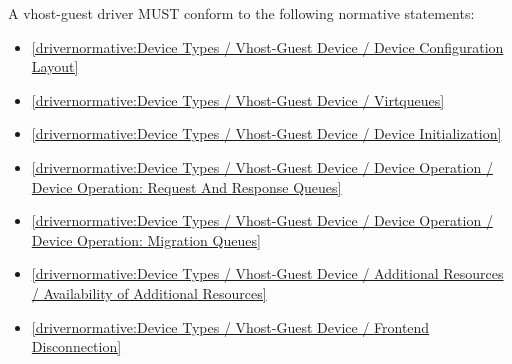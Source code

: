 \label{sec:Conformance / Driver Conformance / Vhost-Guest Driver Conformance}

A vhost-guest driver MUST conform to the following normative statements:

\begin{itemize}
\item \ref{drivernormative:Device Types / Vhost-Guest Device / Device Configuration Layout}
\item \ref{drivernormative:Device Types / Vhost-Guest Device / Virtqueues}
\item \ref{drivernormative:Device Types / Vhost-Guest Device / Device Initialization}
\item \ref{drivernormative:Device Types / Vhost-Guest Device / Device Operation / Device Operation: Request And Response Queues}
\item \ref{drivernormative:Device Types / Vhost-Guest Device / Device Operation / Device Operation: Migration Queues}
\item \ref{drivernormative:Device Types / Vhost-Guest Device / Additional Resources / Availability of Additional Resources}
\item \ref{drivernormative:Device Types / Vhost-Guest Device / Frontend Disconnection}
\end{itemize}
